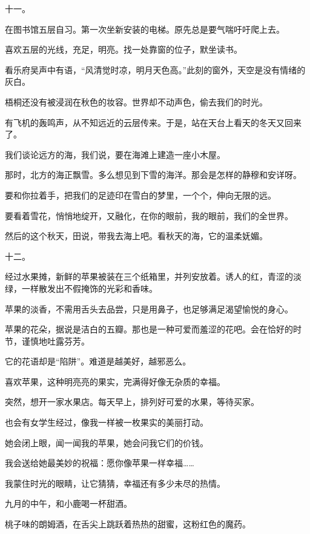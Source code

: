 \documentclass[12pt,a4paper]{article}
\newcommand{\subpart}[1]{
	\begingroup \par
	\vspace{1ex} \centering #1
	\par \endgroup \nopagebreak[4]
}
\begin{document}
		\subpart{十一。}

		在图书馆五层自习。第一次坐新安装的电梯。原先总是要气喘吁吁爬上去。\par
		喜欢五层的光线，充足，明亮。找一处靠窗的位子，默坐读书。\par
		看乐府吴声中有语，“风清觉时凉，明月天色高。”此刻的窗外，天空是没有情绪的灰白。\par
		梧桐还没有被浸润在秋色的妆容。世界却不动声色，偷去我们的时光。\par
		有飞机的轰鸣声，从不知远近的云层传来。于是，站在天台上看天的冬天又回来了。\par
		我们谈论远方的海，我们说，要在海滩上建造一座小木屋。\par
		那时，北方的海正飘雪。多么想见到下雪的海洋。那会是怎样的静穆和安详呀。\par
		要和你拉着手，把我们的足迹印在雪白的梦里，一个个，伸向无限的远。\par
		要看着雪花，悄悄地绽开，又融化，在你的眼前，我的眼前，我们的全世界。\par
		然后的这个秋天，田说，带我去海上吧。看秋天的海，它的温柔妩媚。

		\subpart{十二。}

		经过水果摊，新鲜的苹果被装在三个纸箱里，并列安放着。诱人的红，青涩的淡绿，一样散发出不假掩饰的光彩和香味。\par
		苹果的淡香，不需用舌头去品尝，只是用鼻子，也足够满足渴望愉悦的身心。\par
		苹果的花朵，据说是洁白的五瓣。那也是一种可爱而羞涩的花吧。会在恰好的时节，谨慎地吐露芬芳。\par
		它的花语却是“陷阱”。难道是越美好，越邪恶么。\par
		喜欢苹果，这种明亮亮的果实，完满得好像无杂质的幸福。\par
		突然，想开一家水果店。每天早上，排列好可爱的水果，等待买家。\par
		也会有女学生经过，像我一样被一枚果实的美丽打动。\par
		她会闭上眼，闻一闻我的苹果，她会问我它们的价钱。\par
		我会送给她最美妙的祝福：愿你像苹果一样幸福……

	\endwriting



		我蒙住时光的眼睛，让它猜猜，幸福还有多少未尽的热情。

		九月的中午，和小鹿喝一杯甜酒。

		桃子味的朗姆酒，在舌尖上跳跃着热热的甜蜜，这粉红色的魔药。
\end{document}
